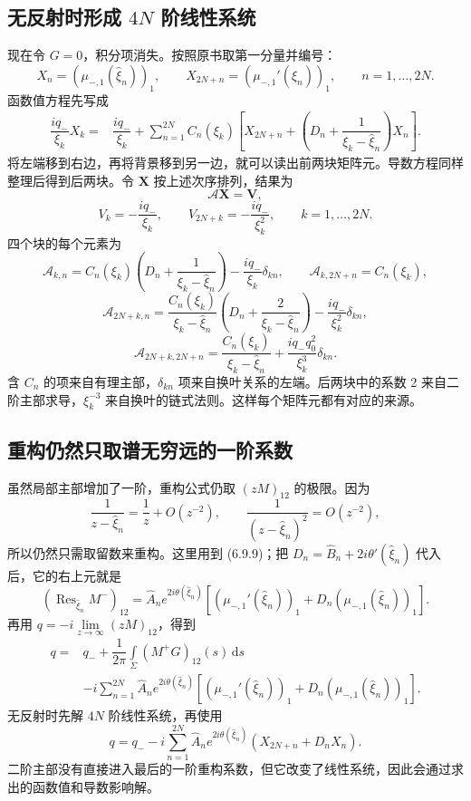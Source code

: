 \documentclass[lang=cn,scheme=chinese,mode=simple,device=normal,color=blue,math=cm,thmcnt=section,12pt]{elegantbook}
\DeclareMathOperator*{\Res}{Res}
\newcommand{\dd}{\,\mathrm{d}}
\newcommand{\eqq}[2]{\tag{#1}\label{eq:#1}#2}
\begin{document}
\subsection*{无反射时形成 \(4N\) 阶线性系统}
现在令 $G=0$，积分项消失。按照原书取第一分量并编号：
\[
X_n=(\mu_{-,1}(\widehat\xi_n))_1,\qquad
X_{2N+n}=(\mu_{-,1}'(\widehat\xi_n))_1,\qquad n=1,\ldots,2N.
\]
函数值方程先写成
\[
\begin{aligned}
\dfrac{iq_-}{\xi_k}X_k
={}&\dfrac{iq_-}{\xi_k}
+\sum\limits_{n=1}^{2N}C_n(\xi_k)
\left[X_{2N+n}
+\left(D_n+\dfrac{1}{\xi_k-\widehat\xi_n}\right)X_n\right].
\end{aligned}
\]
将左端移到右边，再将背景移到另一边，就可以读出前两块矩阵元。导数方程同样整理后得到后两块。令 $\boldsymbol X$ 按上述次序排列，结果为
\begin{equation}\eqq{6.9.35}{\mathcal A\boldsymbol X=\boldsymbol V,}\end{equation}
\[
V_k=-\dfrac{iq_-}{\xi_k},\qquad V_{2N+k}=-\dfrac{iq_-}{\xi_k^2},
\qquad k=1,\ldots,2N.
\]
四个块的每个元素为
\[
\mathcal A_{k,n}
=C_n(\xi_k)\left(D_n+\dfrac{1}{\xi_k-\widehat\xi_n}\right)
-\dfrac{iq_-}{\xi_k}\delta_{kn},
\qquad \mathcal A_{k,2N+n}=C_n(\xi_k),
\]
\[
\mathcal A_{2N+k,n}
=\dfrac{C_n(\xi_k)}{\xi_k-\widehat\xi_n}
\left(D_n+\dfrac{2}{\xi_k-\widehat\xi_n}\right)
-\dfrac{iq_-}{\xi_k^2}\delta_{kn},
\]
\[
\mathcal A_{2N+k,2N+n}
=\dfrac{C_n(\xi_k)}{\xi_k-\widehat\xi_n}
+\dfrac{iq_-q_0^2}{\xi_k^3}\delta_{kn}.
\]
含 $C_n$ 的项来自有理主部，$\delta_{kn}$ 项来自换叶关系的左端。后两块中的系数 2 来自二阶主部求导，$\xi_k^{-3}$ 来自换叶的链式法则。这样每个矩阵元都有对应的来源。

\subsection*{重构仍然只取谱无穷远的一阶系数}
虽然局部主部增加了一阶，重构公式仍取 $(zM)_{12}$ 的极限。因为
\[
\dfrac{1}{z-\widehat\xi_n}=\dfrac{1}{z}+O(z^{-2}),\qquad
\dfrac{1}{(z-\widehat\xi_n)^2}=O(z^{-2}),
\]
所以仍然只需取留数来重构。这里用到 (6.9.9)；把 $D_n=\widehat B_n+2i\theta'(\widehat\xi_n)$ 代入后，它的右上元就是
\[
(\Res_{\widehat\xi_n}M^-)_{12}
=\widehat A_ne^{2i\theta(\widehat\xi_n)}
\left[(\mu_{-,1}'(\widehat\xi_n))_1+D_n(\mu_{-,1}(\widehat\xi_n))_1\right].
\]
再用 $q=-i\displaystyle\lim\limits_{z\to\infty}(zM)_{12}$，得到
\begin{equation}\eqq{6.9.26}{
\begin{aligned}
q={}&q_-+\dfrac{1}{2\pi}\int\limits_\Sigma(M^+G)_{12}(s)\dd s\\
&-i\sum\limits_{n=1}^{2N}\widehat A_ne^{2i\theta(\widehat\xi_n)}
\left[(\mu_{-,1}'(\widehat\xi_n))_1
+D_n(\mu_{-,1}(\widehat\xi_n))_1\right].
\end{aligned}}\end{equation}
无反射时先解 $4N$ 阶线性系统，再使用
\begin{equation}\eqq{6.9.36}{q=q_-
-i\sum\limits_{n=1}^{2N}\widehat A_ne^{2i\theta(\widehat\xi_n)}
(X_{2N+n}+D_nX_n).}\end{equation}
二阶主部没有直接进入最后的一阶重构系数，但它改变了线性系统，因此会通过求出的函数值和导数影响解。
\end{document}
